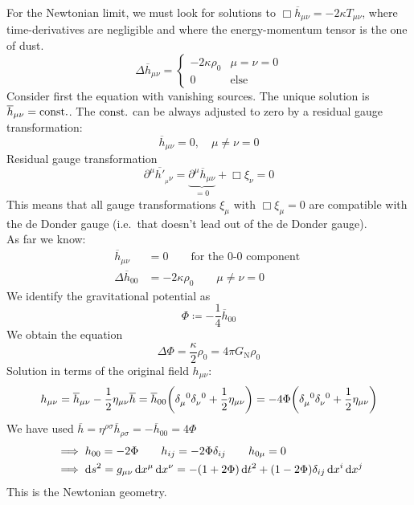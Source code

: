 For the Newtonian limit, we must look for solutions to $\Box \overline{h}_{\mu\nu} = - 2 \kappa T_{\mu\nu}$, where time-derivatives are 
negligible and where the energy-momentum tensor is the one of dust. 
\begin{equation}
    \Delta \overline{h}_{\mu\nu} = 
    \begin{cases}
    	-2 \kappa \rho_0 & \mu=\nu=0 \\
    	0 & \text{else}
    \end{cases}
\end{equation}
Consider first the  equation with vanishing sources. 
The unique solution is $\overline{h}_{\mu\nu} = \text{const.}$. The $\text{const.}$ can be always adjusted to zero by a residual gauge transformation:
\begin{equation}
    \overline{h}_{\mu\nu} = 0, \quad \mu \neq \nu = 0
\end{equation}
Residual gauge transformation
\begin{equation}
    \partial^\mu \overline{h'}_{_\mu\nu} = \underbrace{\partial^\mu \overline{h}_{\mu\nu}}_{=0} + \Box \xi_\nu = 0
\end{equation}
This means that all gauge transformations $\xi_\mu$ with $\Box \xi_\mu = 0$ are compatible with the de Donder gauge 
(i.e.\ that doesn't lead out of the de Donder gauge). \\
As far we know:
\begin{align}
    \overline{h}_{\mu\nu} &= 0 \qquad \text{for the 0-0 component } \\
    \Delta \overline{h}_{00} &= - 2\kappa \rho_0 \qquad \mu \neq \nu = 0
\end{align}
We identify the gravitational potential as
\begin{equation}
    \Phi \coloneqq -\frac{1}{4} \overline{h}_{00}
\end{equation}
We obtain the  equation
\begin{equation}
    \Delta \Phi = \frac{\kappa}{2} \rho_0 = 4 \pi G_\text{N} \rho_0
\end{equation}
Solution in terms of the original field $h_{\mu\nu}$:
\begin{equation}
    h_{\mu\nu} = \overline{h}_{\mu\nu} - \frac{1}{2} \eta_{\mu\nu} \overline{h} 
    = \overline{h}_{00} \left( \tensor{\delta}{_\mu^0} \tensor{\delta}{_\nu^0} + \frac{1}{2} \eta_{\mu\nu} \right) 
    = - 4\Phi \left( \tensor{\delta}{_\mu^0} \tensor{\delta}{_\nu^0} + \frac{1}{2} \eta_{\mu\nu} \right)
\end{equation}
We have used $\overline{h}=\eta^{\rho\sigma}\overline{h}_{\rho\sigma} = -\overline{h}_{00} = 4 \Phi$
\begin{align}
    & \implies h_{00}=-2\Phi \qquad h_{ij}=-2\Phi\delta_{ij} \qquad h_{0\mu}=0 \\
    & \implies \dif{s}^2 = g_{\mu\nu} \dif{x}^\mu \dif{x}^\nu = - (1+2\Phi)\dif{t}^2 + (1-2\Phi)\delta_{ij} \dif{x}^i \dif{x}^j
\end{align}
This is the Newtonian geometry.
